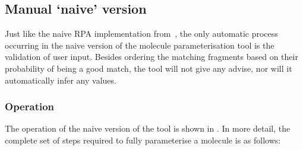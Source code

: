 \subsection{Manual `naive' version}
Just like the naive RPA implementation from~\cite{payne2000varying}, the only automatic process occurring in the naive version of the molecule parameterisation tool is the validation of user input. Besides ordering the matching fragments based on their probability of being a good match, the tool will not give any advise, nor will it automatically infer any values.

\subsubsection{Operation}
The operation of the naive version of the tool is shown in . In more detail, the complete set of steps required to fully parameterise a molecule is as follows:
